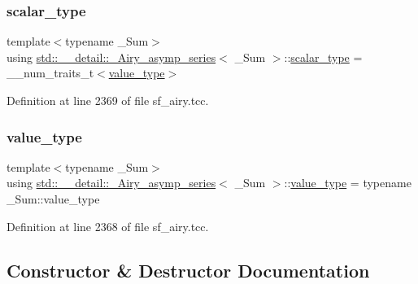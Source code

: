 \subsubsection{\texorpdfstring{scalar\+\_\+type}{scalar\_type}}
{\footnotesize\ttfamily template$<$typename \+\_\+\+Sum$>$ \\
using \hyperlink{classstd_1_1____detail_1_1__Airy__asymp__series}{std\+::\+\_\+\+\_\+detail\+::\+\_\+\+Airy\+\_\+asymp\+\_\+series}$<$ \+\_\+\+Sum $>$\+::\hyperlink{classstd_1_1____detail_1_1__Airy__asymp__series_ac2d0fa6d86d7a83c06dca057d0dfec3a}{scalar\+\_\+type} =  \+\_\+\+\_\+num\+\_\+traits\+\_\+t$<$\hyperlink{classstd_1_1____detail_1_1__Airy__asymp__series_a729a698f23629a2f94b6ef71f377efc5}{value\+\_\+type}$>$}



Definition at line 2369 of file sf\+\_\+airy.\+tcc.

\mbox{\label{classstd_1_1____detail_1_1__Airy__asymp__series_a729a698f23629a2f94b6ef71f377efc5}} 
\subsubsection{\texorpdfstring{value\+\_\+type}{value\_type}}
{\footnotesize\ttfamily template$<$typename \+\_\+\+Sum$>$ \\
using \hyperlink{classstd_1_1____detail_1_1__Airy__asymp__series}{std\+::\+\_\+\+\_\+detail\+::\+\_\+\+Airy\+\_\+asymp\+\_\+series}$<$ \+\_\+\+Sum $>$\+::\hyperlink{classstd_1_1____detail_1_1__Airy__asymp__series_a729a698f23629a2f94b6ef71f377efc5}{value\+\_\+type} =  typename \+\_\+\+Sum\+::value\+\_\+type}



Definition at line 2368 of file sf\+\_\+airy.\+tcc.



\subsection{Constructor \& Destructor Documentation}
\mbox{\label{classstd_1_1____detail_1_1__Airy__asymp__series_a2768b3e101876b969b606cbde8b2e133}} 
